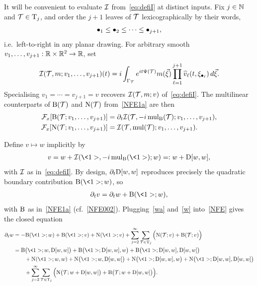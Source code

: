 It will be convenient to evaluate $\mathcal{I}$ from~\eqref{eq:defiI} at distinct inputs. Fix $j\in\mathbb{N}$ and $\mathcal{T}\in\mathrm{T}_j$, and order the $j+1$ leaves of $\mathcal{T}$ lexicographically by their words,
\begin{align}
\label{lexic}
\bullet_1\le \bullet_2\le \dots \le \bullet_{j+1},
\end{align}
i.e.\ left-to-right in any planar drawing. For arbitrary smooth $v_1,\dots,v_{j+1}:\mathbb{R}\times \mathbb{R}^2\to\mathbb{R}$, set
\begin{equation}
\label{eq:defiImulti}
\mathcal{I}(\mathcal{T}, m; v_1,\dots,v_{j+1}) (t)
= i \int_{\Gamma_{\mathcal{T}}} e^{it\Psi(\mathcal{T})} m(\vec{\xi}) \prod_{\ell=1}^{j+1} \widehat v_\ell (t,\xi_{\bullet_\ell})\, d\vec{\xi}.
\end{equation}
Specialising $v_1=\cdots=v_{j+1}=v$ recovers $\mathcal{I}(\mathcal{T}, m; v)$ of~\eqref{eq:defiI}. The multilinear counterparts of $\mathrm{B}(\mathcal{T})$ and $\mathrm{N}(\mathcal{T})$ from~\eqref{NFE1a} are then
\begin{align*}
{\mathcal{F}}_x [\mathrm{B}(\mathcal{T}; v_1, \ldots, v_{j+1}) ]  &= \partial_t\mathcal{I} (\mathcal{T},- i \operatorname{mul_{\mathrm{B}}}(\mathcal{T}) ; v_1,\dots,v_{j+1}),\\
{\mathcal{F}}_x [\mathrm{N}(\mathcal{T}; v_1, \ldots, v_{j+1} ) ]  &= \mathcal{I}(\mathcal{T},\operatorname{mul}(\mathcal{T}) ; v_1, \ldots, v_{j+1} ).
\end{align*}

Define $v\mapsto w$ implicitly by
\begin{align}
\label{w}
v = w + \Ical(\<1>, - i \mulB(\<1>); w) =: w + \D[w, w],
\end{align}
with $\mathcal{I}$ as in~\eqref{eq:defiI}. By design, $\partial_t\mathrm{D}[w,w]$ reproduces precisely the quadratic boundary contribution $\BB(\<1>;w)$, so
\begin{align}
\label{wa}
\dt v = \dt w + \BB(\<1>; w),
\end{align}
with $\mathrm{B}$ as in~\eqref{NFE1a} (cf.~\eqref{NFE002}). Plugging~\eqref{wa} and~\eqref{w} into~\eqref{NFE} gives the closed equation
\begin{align}
\dt w
& = -\BB(\<1>;w) + \BB(\<1>;v) + \NN(\<1>;v) + \sum_{j=2}^\infty \sum_{\TT\in\Tr_j} \Big( \NN(\TT; v)  + \BB(\TT; v) \Big) \nonumber \\
& =  \BB\big(\<1>; w, \D[w, w] \big) + \BB \big(\<1>; \D[w, w],w\big) + \BB\big(\<1>; \D[w,w], \D[w, w]\big) \nonumber\\
& \qquad + \NN(\<1>; w ,w )  + \NN\big(\<1>; w, \D[w, w]\big) + \NN\big(\<1>; \D[w, w], w\big) + \NN\big(\<1>; \D[w, w],\D[w, w]\big) \nonumber\\
& \qquad + \sum_{j=2}^\infty \sum_{\TT\in \Tr_j} \Big( \NN\big(\TT; w+ \D[w, w] \big) +  \BB\big(\TT; w + \D[w, w]\big) \Big).
\label{w1}
\end{align}

